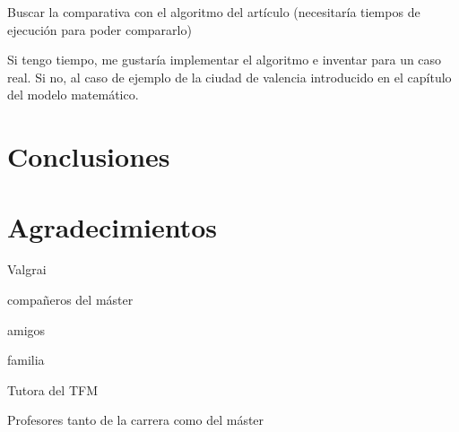 \documentclass[12pt,a4paper]{book}
\begin{document}
Buscar la comparativa con el algoritmo del artículo (necesitaría tiempos de ejecución para poder compararlo)

Si tengo tiempo, me gustaría implementar el algoritmo e inventar para un caso real. Si no, al caso de ejemplo de la ciudad de valencia introducido en el capítulo del modelo matemático.

\chapter{Conclusiones}


\chapter{Agradecimientos}
Valgrai

compañeros del máster

amigos

familia

Tutora del TFM

Profesores tanto de la carrera como del máster 
\end{document}
